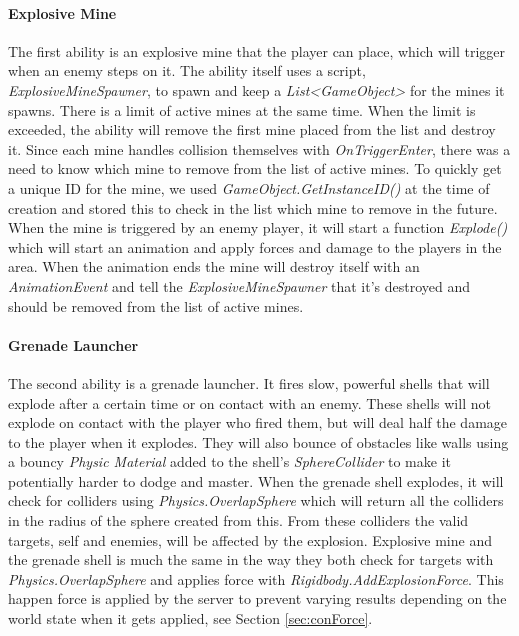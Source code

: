 \paragraph{Explosive Mine}
The first ability is an explosive mine that the player can place, which will trigger when an enemy steps on it. The ability itself uses a script, \emph{ExplosiveMineSpawner}, to spawn and keep a \emph{List<GameObject>} for the mines it spawns. There is a limit of active mines at the same time. When the limit is exceeded, the ability will remove the first mine placed from the list and destroy it. Since each mine handles collision themselves with \emph{OnTriggerEnter}, there was a need to know which mine to remove from the list of active mines. To quickly get a unique ID for the mine, we used \emph{GameObject.GetInstanceID()} at the time of creation and stored this to check in the list which mine to remove in the future. When the mine is triggered by an enemy player, it will start a function \emph{Explode()} which will start an animation and apply forces and damage to the players in the area. When the animation ends the mine will destroy itself with an \emph{AnimationEvent} and tell the \emph{ExplosiveMineSpawner} that it's destroyed and should be removed from the list of active mines.

\paragraph{Grenade Launcher}
The second ability is a grenade launcher. It fires slow, powerful shells that will explode after a certain time or on contact with an enemy. These shells will not explode on contact with the player who fired them, but will deal half the damage to the player when it explodes. They will also bounce of obstacles like walls using a bouncy \emph{Physic Material} added to the shell's \emph{SphereCollider} to make it potentially harder to dodge and master. When the grenade shell explodes, it will check for colliders using \emph{Physics.OverlapSphere} which will return all the colliders in the radius of the sphere created from this. From these colliders the valid targets, self and enemies, will be affected by the explosion. Explosive mine and the grenade shell is much the same in the way they both check for targets with \emph{Physics.OverlapSphere} and applies force with \emph{Rigidbody.AddExplosionForce}. This happen force is applied by the server to prevent varying results depending on the world state when it gets applied, see Section \ref{sec:conForce}.

